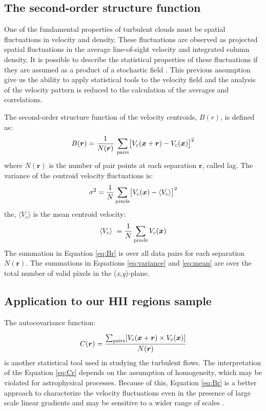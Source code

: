 \documentclass[fleqn,usenatbib, useAMS, a4paper]{mnras}
\begin{document}
\subsection{The second-order structure function}
\label{sec:second-order-struct}
One of the fundamental properties of turbulent clouds must be spatial fluctuations in velocity and density.                                     
These fluctuations are observed as projected spatial fluctuations in the average line-of-sight velocity and integrated column density.
It is possible to describe the statistical properties of these fluctuations if they are assumed as a product of a stochastic field \citep{1984ApJ...277..556S}. 
This previous assumption give us the ability to apply statistical tools to the velocity field and the analysis of the velocity pattern is reduced to the calculation of the averages and correlations.

The second-order structure function of the velocity centroids, $B(r)$, is defined as:
%
\begin{equation}\label{eq:Br}
  B(\boldsymbol{r}) = \dfrac{1}{N(\boldsymbol{r})}
  \,
  \sum_{\text{pairs}} \bigl[
  V_{c}(\boldsymbol{x} + \boldsymbol{r}) - V_{c}(\boldsymbol{x})
  \bigr]^{2}
\end{equation}
%
where $N(\boldsymbol{r})$ is the number of pair points at each separation \(\boldsymbol{r}\), called lag. 
The variance of the centroid velocity fluctuations is:
%
\begin{equation}\label{eq:variance}
\sigma^2  = \frac{1}{N} \sum_{\text{pixels}} \bigl[ V_c (\boldsymbol{x}) -\langle V_ c\rangle  \bigr]^2
\end{equation}
%
the, \(\langle V_c \rangle \) is the mean centroid velocity:
%
\begin{equation}\label{eq:mean}
\langle V_c \rangle \  = \frac{1}{N} \sum_{\text{pixels}} V_c (\boldsymbol{x})
\end{equation}
%
The summation in Equation \ref{eq:Br} is over all data pairs for each separation \(N(\boldsymbol{r})\).
The summations in Equations \ref{eq:variance} and \ref{eq:mean} are over the total number of valid pixels in the (\textit{x},\textit{y})-plane.

\subsection{Application to our HII regions sample}\label{sec:methods-apply}

The autocovariance function:

\begin{equation}\label{eq:Cr}
C(\boldsymbol{r}) = \dfrac{\sum_{\text{pairs}}[V_{c}(\boldsymbol{x} + \boldsymbol{r}) \times V_{c}(\boldsymbol{x}) ]} {N(\boldsymbol{r})}
\end{equation}
%
is another statistical tool used in studying the turbulent flows.
The interpretation of the Equation \ref{eq:Cr} depends on the assumption of homogeneity, which may be violated for astrophysical processes.
Because of this, Equation \ref{eq:Br} is a better approach to characterize the velocity fluctuations even in the presence of large scale linear gradients and may be sensitive to a wider range of scales \citep{1984ApJ...277..556S}.
\end{document}
